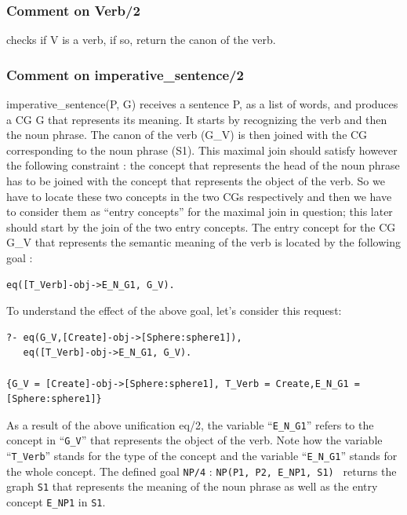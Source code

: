 \documentclass{book}
\begin{document}
\subsubsection{Comment on Verb/2} 

checks if V is a verb, if so, return the canon of the verb.

\subsubsection{Comment on imperative\_sentence/2}

imperative\_sentence(P, G) receives a sentence P, as a list of
words, and produces a CG G that represents its meaning. It starts by
recognizing the verb and then the noun phrase. The canon of the verb
(G\_V) is then joined with the CG corresponding to the noun phrase
(S1). This maximal join should satisfy however the following
constraint : the concept that represents the head of the noun phrase
has to be joined with the concept that represents the object of the
verb. So we have to locate these two concepts in the two CGs
respectively and then we have to consider them as ``entry concepts'' for
the maximal join in question; this later should start by the join of
the two entry concepts.  The entry concept for the CG G\_V that
represents the semantic meaning of the verb is located by the
following goal : 

       
\begin{verbatim}
eq([T_Verb]-obj->E_N_G1, G_V).
\end{verbatim}


To understand the effect of the above goal, let's consider this
request:

\begin{verbatim}
?- eq(G_V,[Create]-obj->[Sphere:sphere1]),
   eq([T_Verb]-obj->E_N_G1, G_V).

{G_V = [Create]-obj->[Sphere:sphere1], T_Verb = Create,E_N_G1 =
[Sphere:sphere1]}
\end{verbatim}


As a result of the above unification eq/2, the variable
``\texttt{E\_N\_G1}'' refers to the concept in ``\texttt{G\_V}'' that
represents the object of the verb. Note how the variable
``\texttt{T\_Verb}'' stands for the type of the concept and the
variable ``\texttt{E\_N\_G1}'' stands for the whole concept.  The
defined goal \texttt{NP/4} : \texttt{NP(P1, P2, E\_NP1, S1) } returns
the graph \texttt{S1} that represents the meaning of the noun phrase
as well as the entry concept \texttt{E\_NP1} in \texttt{S1}.
\end{document}
